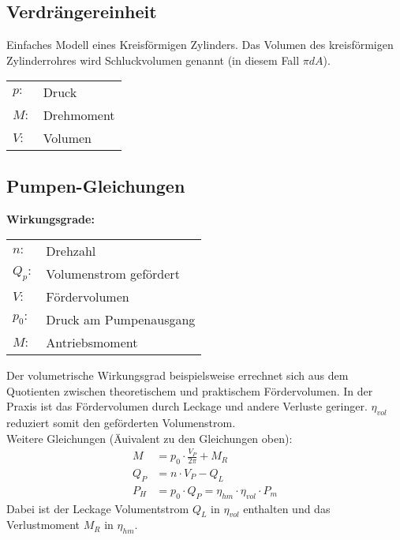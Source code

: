 \subsection{Verdrängereinheit}
Einfaches Modell eines Kreisförmigen Zylinders. Das Volumen des kreisförmigen Zylinderrohres wird Schluckvolumen genannt (in diesem Fall $\pi  d  A$). 
\begin{tabular}{ll}
$p:$ & Druck \\
$M:$ & Drehmoment \\
$V:$ & Volumen
\end{tabular}


\subsection{Pumpen-Gleichungen}
\textbf{Wirkungsgrade:}

\begin{tabular}{ll}
$n:$ & Drehzahl \\
$Q_p:$ & Volumenstrom gefördert\\
$V:$ & Fördervolumen \\
$p_0:$ & Druck am Pumpenausgang \\
$M:$ & Antriebsmoment
\end{tabular}

Der volumetrische Wirkungsgrad beispielsweise errechnet sich aus dem Quotienten zwischen theoretischem und praktischem Fördervolumen. In der Praxis ist das Fördervolumen durch Leckage und andere Verluste geringer. $\eta_{vol}$ reduziert somit den geförderten Volumenstrom. \\

Weitere Gleichungen (Äuivalent zu den Gleichungen oben):
\begin{align*}
M &= p_0 \cdot \frac{V_P}{2 \pi} + M_R \tag{Pumpenmoment} \\
Q_P &= n \cdot V_P - Q_L \tag{Volumenstrom} \\
P_H &= p_0 \cdot Q_P = \eta_{hm} \cdot \eta_{vol} \cdot P_m \tag{Leistung}
\end{align*}
Dabei ist der Leckage Volumentstrom $Q_L$ in $\eta_{vol}$ enthalten und das Verlustmoment $M_R$ in $\eta_{hm}$.


